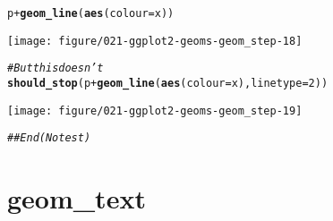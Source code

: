 \documentclass[a4paper,titlepage]{tufte-handout}\usepackage[]{graphicx}\usepackage[]{color}
\makeatletter
\def\maxwidth{ %
  \ifdim\Gin@nat@width>\linewidth
    \linewidth
  \else
    \Gin@nat@width
  \fi
}
\newcommand{\hlnum}[1]{\textcolor[rgb]{0.686,0.059,0.569}{#1}}%
\newcommand{\hlcom}[1]{\textcolor[rgb]{0.678,0.584,0.686}{\textit{#1}}}%
\newcommand{\hlopt}[1]{\textcolor[rgb]{0,0,0}{#1}}%
\newcommand{\hlstd}[1]{\textcolor[rgb]{0.345,0.345,0.345}{#1}}%
\newcommand{\hlkwc}[1]{\textcolor[rgb]{0.333,0.667,0.333}{#1}}%
\newcommand{\hlkwd}[1]{\textcolor[rgb]{0.737,0.353,0.396}{\textbf{#1}}}%
\newenvironment{kframe}{%
 \def\at@end@of@kframe{}%
 \ifinner\ifhmode%
  \def\at@end@of@kframe{\end{minipage}}%
  \begin{minipage}{\columnwidth}%
 \fi\fi%
 \def\FrameCommand##1{\hskip\@totalleftmargin \hskip-\fboxsep
 \colorbox{shadecolor}{##1}\hskip-\fboxsep
     \hskip-\linewidth \hskip-\@totalleftmargin \hskip\columnwidth}%
 \MakeFramed {\advance\hsize-\width
   \@totalleftmargin\z@ \linewidth\hsize
   \@setminipage}}%
 {\par\unskip\endMakeFramed%
 \at@end@of@kframe}
\newenvironment{knitrout}{}{} %
\makeatother
\begin{document}
\begin{knitrout}
\begin{kframe}\begin{alltt}
\hlstd{p} \hlopt{+} \hlkwd{geom_line}\hlstd{(}\hlkwd{aes}\hlstd{(}\hlkwc{colour} \hlstd{= x))}
\end{alltt}
\end{kframe}
\texttt{[image: figure/021-ggplot2-geoms-geom\_step-18]} 
\begin{kframe}\begin{alltt}
\hlcom{# But this doesn't}
\hlkwd{should_stop}\hlstd{(p} \hlopt{+} \hlkwd{geom_line}\hlstd{(}\hlkwd{aes}\hlstd{(}\hlkwc{colour} \hlstd{= x),} \hlkwc{linetype}\hlstd{=}\hlnum{2}\hlstd{))}
\end{alltt}
\end{kframe}
\texttt{[image: figure/021-ggplot2-geoms-geom\_step-19]} 
\begin{kframe}\begin{alltt}
\hlcom{## End(No test)}
\end{alltt}
\end{kframe}
\end{knitrout}


\section{geom\_text}
\end{document}
